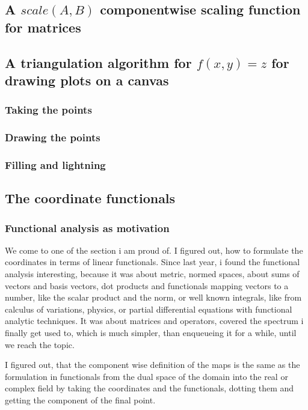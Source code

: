 \documentclass[a4paper]{article}
\begin{document}
\subsection{A $scale(A,B)$ componentwise scaling function for matrices}


\subsection{A triangulation algorithm for $f(x,y)=z$ for drawing plots on a canvas}

\subsubsection{Taking the points}
\subsubsection{Drawing the points}
\subsubsection{Filling and lightning}



\subsection{The coordinate functionals}

\subsubsection{Functional analysis as motivation}

We come to one of the section i am proud of. I figured out, how to formulate the coordinates in terms of linear functionals. Since last year, i found the functional analysis interesting, because it was about metric, normed spaces, about sums of vectors and basis vectors, dot products and functionals mapping vectors to a number, like the scalar product and the norm, or well known integrals, like from calculus of variations, physics, or partial differential equations with functional analytic techniques. It was about matrices and operators, covered the spectrum i finally get used to, which is much simpler, than enqueueing it for a while, until we reach the topic.

I figured out, that the component wise definition of the maps is the same as the formulation in functionals from the dual space of the domain into the real or complex field by taking the coordinates and the functionals, dotting them and getting the component of the final point.
\end{document}
